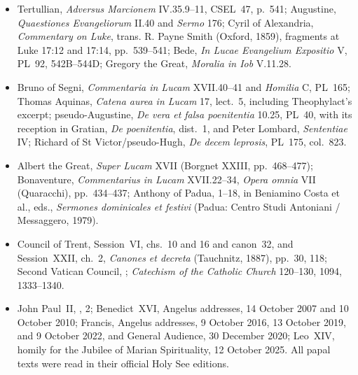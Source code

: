 {\begin{itemize}[itemsep=0em,topsep=0.15em,parsep=0pt]
\item Tertullian, \emph{Adversus Marcionem} IV.35.9--11, CSEL~47, p.~541;
Augustine, \emph{Quaestiones Evangeliorum} II.40 and \emph{Sermo} 176;
Cyril of Alexandria, \emph{Commentary on Luke}, trans. R. Payne Smith
(Oxford, 1859), fragments at Luke 17:12 and 17:14, pp.~539--541; Bede,
\emph{In Lucae Evangelium Expositio} V, PL~92, 542B--544D; Gregory the
Great, \emph{Moralia in Iob} V.11.28.

\item Bruno of Segni, \emph{Commentaria in Lucam} XVII.40--41 and
\emph{Homilia} C, PL~165; Thomas Aquinas, \emph{Catena aurea in Lucam}
17, lect.~5, including Theophylact's excerpt; pseudo-Augustine,
\emph{De vera et falsa poenitentia} 10.25, PL~40, with its reception in
Gratian, \emph{De poenitentia}, dist.~1, and Peter Lombard,
\emph{Sententiae} IV; Richard of St Victor/pseudo-Hugh,
\emph{De decem leprosis}, PL~175, col.~823.

\item Albert the Great, \emph{Super Lucam} XVII (Borgnet XXIII,
pp.~468--477); Bonaventure, \emph{Commentarius in Lucam} XVII.22--34,
\emph{Opera omnia} VII (Quaracchi), pp.~434--437; Anthony of Padua,
1--18, in Beniamino Costa et al., eds., \emph{Sermones dominicales et
festivi} (Padua: Centro Studi Antoniani / Messaggero, 1979).

\item Council of Trent, Session~VI, chs.~10 and 16 and canon~32, and
Session~XXII, ch.~2, \emph{Canones et decreta} (Tauchnitz, 1887), pp.~30,
118; Second Vatican Council,
;
\emph{Catechism of the Catholic Church} 120--130, 1094, 1333--1340.

\item John Paul~II,
, 2;
Benedict~XVI, Angelus addresses, 14 October 2007 and 10 October 2010;
Francis, Angelus addresses, 9 October 2016, 13 October 2019, and 9 October
2022, and General Audience, 30 December 2020; Leo~XIV, homily for the Jubilee
of Marian Spirituality, 12 October 2025. All papal texts were read in their
official Holy See editions.


\end{itemize}}
